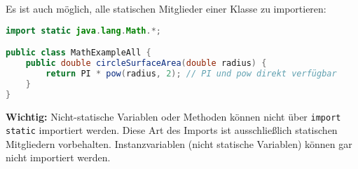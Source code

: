 Es ist auch möglich, alle statischen Mitglieder einer Klasse zu importieren:
\begin{lstlisting}[language=Java, caption={Statischer Import aller Mitglieder von Math}]
import static java.lang.Math.*;

public class MathExampleAll {
    public double circleSurfaceArea(double radius) {
        return PI * pow(radius, 2); // PI und pow direkt verfügbar
    }
}
\end{lstlisting}

\textbf{Wichtig:} Nicht-statische Variablen oder Methoden können nicht über \texttt{import static} importiert werden. 
Diese Art des Imports ist ausschließlich statischen Mitgliedern vorbehalten. Instanzvariablen (nicht statische Variablen) können
gar nicht importiert werden.
